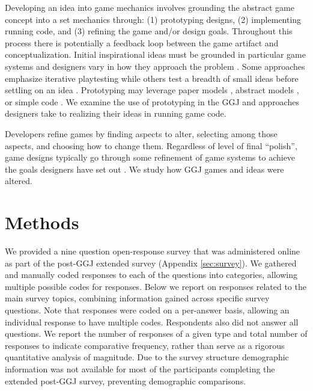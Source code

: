 \documentclass{sig-alternate}
\begin{document}
Developing an idea into game mechanics involves grounding the abstract game concept into a set mechanics through: (1) prototyping designs, (2) implementing running code, and (3) refining the game and/or design goals. Throughout this process there is potentially a feedback loop between the game artifact and conceptualization. Initial inspirational ideas must be grounded in particular game systems and designers vary in how they approach the problem \cite{gabler2005:7day-prototype,manker2011:prototyping,nelson2009:reqanal}. Some approaches emphasize iterative playtesting \cite{fullerton2008:playcentric,schell2008:gamedesign} while others test a breadth of small ideas before settling on an idea \cite{gabler2005:7day-prototype}. Prototyping may leverage paper models \cite{manker2011:prototyping}, abstract models \cite{dormans2011:machinations2,nelson2009:reqanal}, or simple code \cite{gabler2005:7day-prototype}. We examine the use of prototyping in the GGJ and approaches designers take to realizing their ideas in running game code.

Developers refine games by finding aspects to alter, selecting among those aspects, and choosing how to change them. Regardless of level of final ``polish'', game designs typically go through some refinement of game systems to achieve the goals designers have set out \cite{fullerton2008:playcentric,schell2008:gamedesign}. We study how GGJ games and ideas were altered.


\section{Methods}
We provided a nine question open-response survey that was administered online as part of the post-GGJ extended survey (Appendix \ref{sec:survey}). We gathered and manually coded responses to each of the questions into categories, allowing multiple possible codes for responses. Below we report on responses related to the main survey topics, combining information gained across specific survey questions. Note that responses were coded on a per-answer basis, allowing an individual response to have multiple codes. Respondents also did not answer all questions. We report the number of responses of a given type and total number of responses to indicate comparative frequency, rather than serve as a rigorous quantitative analysis of magnitude. Due to the survey structure demographic information was not available for most of the participants completing the extended post-GGJ survey, preventing demographic comparisons.
\end{document}
